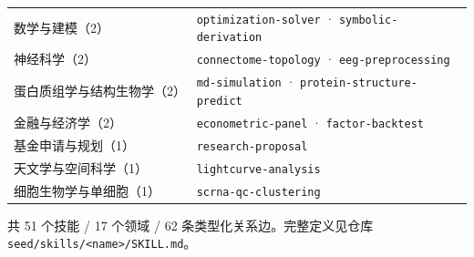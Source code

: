 \begin{center}
\begin{tabular}{@{}>{\raggedright\arraybackslash}p{3.0cm} >{\raggedright\arraybackslash}p{12.2cm}@{}}
数学与建模（2） & \texttt{optimization-solver} \textcolor{ink3}{·} \texttt{symbolic-derivation} \\[0.2em]
神经科学（2） & \texttt{connectome-topology} \textcolor{ink3}{·} \texttt{eeg-preprocessing} \\[0.2em]
蛋白质组学与结构生物学（2） & \texttt{md-simulation} \textcolor{ink3}{·} \texttt{protein-structure-predict} \\[0.2em]
金融与经济学（2） & \texttt{econometric-panel} \textcolor{ink3}{·} \texttt{factor-backtest} \\[0.2em]
基金申请与规划（1） & \texttt{research-proposal} \\[0.2em]
天文学与空间科学（1） & \texttt{lightcurve-analysis} \\[0.2em]
细胞生物学与单细胞（1） & \texttt{scrna-qc-clustering} \\[0.2em]
\bottomrule
\end{tabular}
\end{center}

\vspace{0.4em}\noindent\footnotesize\color{ink3}共 51 个技能 / 17 个领域 / 62 条类型化关系边。完整定义见仓库 \texttt{seed/skills/<name>/SKILL.md}。